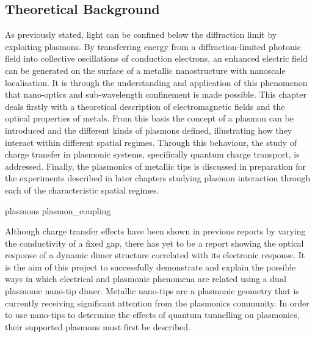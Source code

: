 \documentclass[12pt, a4paper, oneside]{book}
\begin{document}
\begin{singlespace}
{\color{white}
\chapter{Theoretical Background}}
\label{ch:theory}
\end{singlespace}


As previously stated, light can be confined below the diffraction limit by exploiting plasmons. By transferring energy from a diffraction-limited photonic field into collective oscillations of conduction electrons, an enhanced electric field can be generated on the surface of a metallic nanostructure with nanoscale localisation. It is through the understanding and application of this phenomenon that nano-optics and sub-wavelength confinement is made possible.
This chapter deals firstly with a theoretical description of electromagnetic fields and the optical properties of metals. From this basis the concept of a plasmon can be introduced and the different kinds of plasmons defined, illustrating how they interact within different spatial regimes. Through this behaviour, the study of charge transfer in plasmonic systems, specifically quantum charge transport, is addressed. Finally, the plasmonics of metallic tips is discussed in preparation for the experiments described in later chapters studying plasmon interaction through each of the characteristic spatial regimes.

{plasmons}
{plasmon_coupling}

Although charge transfer effects have been shown in previous reports by varying the conductivity of a fixed gap, there has yet to be a report showing the optical response of a dynamic dimer structure correlated with its electronic response. It is the aim of this project to successfully demonstrate and explain the possible ways in which electrical and plasmonic phenomena are related using a dual plasmonic nano-tip dimer. Metallic nano-tips are a plasmonic geometry that is currently receiving significant attention from the plasmonics community. In order to use nano-tips to determine the effects of quantum tunnelling on plasmonics, their supported plasmons must first be described.
\end{document}
